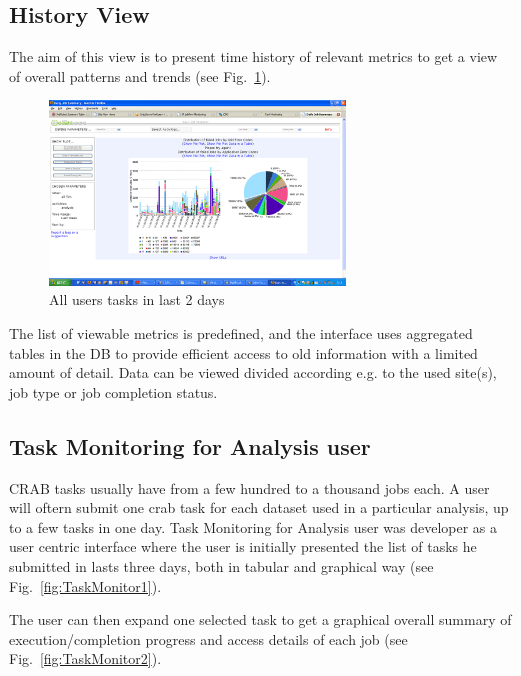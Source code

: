 \subsection{History View}
The aim of this view is to present time history of relevant
metrics to get a view of overall patterns and trends (see Fig.~\ref{fig:HistoryView}).
\begin{figure}
 \includegraphics[width=0.70\textwidth]{figures/HistoryView.png}
\caption{All users tasks in last 2 days}
\label{fig:HistoryView}
\end{figure}
The list of viewable metrics is predefined, and
the interface uses aggregated tables in the DB to provide
efficient access to old information with a limited
amount of detail. Data can be viewed divided
according e.g. to the used site(s), job type or job completion status.


\subsection{Task Monitoring for Analysis user}
CRAB tasks usually have from a few hundred
to a thousand jobs each. A user will oftern submit one crab task
for each dataset used in a particular analysis, up to a few
tasks in one day. Task Monitoring for Analysis user was
developer as a user centric interface where the user is
initially presented the list of tasks he submitted in lasts
three days, both in tabular and graphical way (see Fig.~\ref{fig:TaskMonitor1}).

The user can then expand one selected task to get
a graphical overall summary of execution/completion progress
and access details of each job (see Fig.~\ref{fig:TaskMonitor2}).



